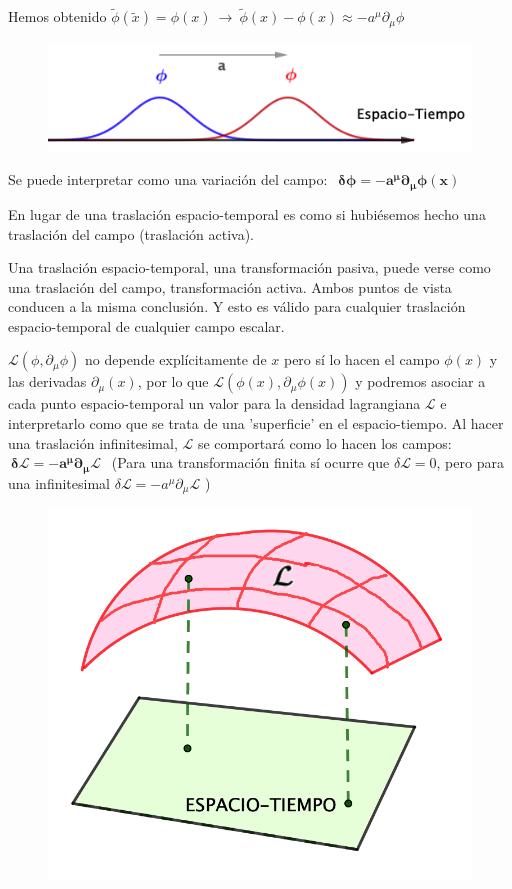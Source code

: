 \vspace{5mm}
Hemos obtenido $\tilde \phi(\tilde x) = \phi(x) \ \to \ \tilde \phi(x)-\phi(x) \approx - a^\mu \partial_\mu \phi$
\begin{multicols}{2}
\begin{figure}[H]
	\centering
	\includegraphics[width=.4\textwidth]{imagenes/img34-02.png}
\end{figure}
Se puede interpretar como una variación del campo:
$\ \ \boldsymbol{ \delta \phi=- a^\mu \partial_\mu \phi(x)}$
\end{multicols}
En lugar de una traslación espacio-temporal es como si hubiésemos hecho una traslación del campo (traslación activa).

Una traslación espacio-temporal, una transformación pasiva, puede verse como una traslación del campo, transformación activa. Ambos puntos de vista conducen a la misma conclusión. Y esto es válido para cualquier traslación espacio-temporal de cualquier campo escalar.

\vspace{5mm}
\begin{multicols}{2}
$\mathcal L(\phi, \partial_\mu \phi)$ no depende explícitamente de $x$ pero sí lo hacen el campo $\phi(x)$ y las derivadas $\partial_\mu(x)$, por lo que $\mathcal L(\phi(x), \partial_\mu \phi(x))$ y podremos asociar a cada punto espacio-temporal un valor para la densidad lagrangiana $\mathcal L$ e interpretarlo como que se trata de una 'superficie' en el espacio-tiempo.  Al hacer una traslación infinitesimal, $\mathcal L$ se comportará como lo hacen los campos: $\  \boldsymbol{ \delta \mathcal L=- a^\mu \partial_\mu \mathcal L}\ \ $ \textcolor{gris}{(Para una transformación finita sí ocurre que $\delta \mathcal L=0$, pero para una infinitesimal $\displaystyle \delta \mathcal L=- a^\mu \partial_\mu \mathcal L$ )}
 
\begin{figure}[H]
	\centering
	\includegraphics[width=.35\textwidth]{imagenes/img34-03.png}
\end{figure}
\end{multicols}

